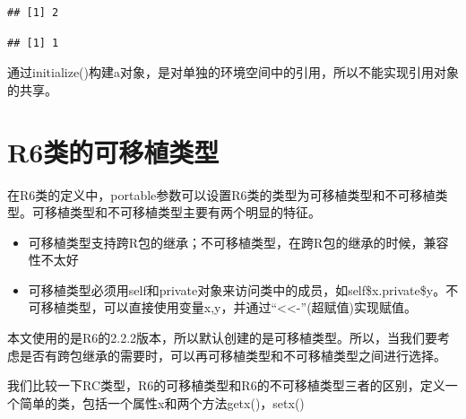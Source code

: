 \documentclass[]{book}
\newenvironment{Shaded}{\begin{snugshade}}{\end{snugshade}}
\newcommand{\KeywordTok}[1]{\textcolor[rgb]{0.13,0.29,0.53}{\textbf{#1}}}
\newcommand{\DataTypeTok}[1]{\textcolor[rgb]{0.13,0.29,0.53}{#1}}
\newcommand{\DecValTok}[1]{\textcolor[rgb]{0.00,0.00,0.81}{#1}}
\newcommand{\StringTok}[1]{\textcolor[rgb]{0.31,0.60,0.02}{#1}}
\newcommand{\CommentTok}[1]{\textcolor[rgb]{0.56,0.35,0.01}{\textit{#1}}}
\newcommand{\ControlFlowTok}[1]{\textcolor[rgb]{0.13,0.29,0.53}{\textbf{#1}}}
\newcommand{\OperatorTok}[1]{\textcolor[rgb]{0.81,0.36,0.00}{\textbf{#1}}}
\newcommand{\NormalTok}[1]{#1}
\begin{document}
\begin{verbatim}
## [1] 2
\end{verbatim}

\begin{Shaded}
\end{Shaded}

\begin{verbatim}
## [1] 1
\end{verbatim}

通过initialize()构建a对象，是对单独的环境空间中的引用，所以不能实现引用对象的共享。

\section{R6类的可移植类型}\label{r6}

在R6类的定义中，portable参数可以设置R6类的类型为可移植类型和不可移植类型。可移植类型和不可移植类型主要有两个明显的特征。

\begin{itemize}
\item
  可移植类型支持跨R包的继承；不可移植类型，在跨R包的继承的时候，兼容性不太好
\item
  可移植类型必须用self和private对象来访问类中的成员，如self\$x.private\$y。不可移植类型，可以直接使用变量x,y，并通过``\textless{}\textless{}-''(超赋值)实现赋值。
\end{itemize}

本文使用的是R6的2.2.2版本，所以默认创建的是可移植类型。所以，当我们要考虑是否有跨包继承的需要时，可以再可移植类型和不可移植类型之间进行选择。

我们比较一下RC类型，R6的可移植类型和R6的不可移植类型三者的区别，定义一个简单的类，包括一个属性x和两个方法getx()，setx()

\begin{Shaded}
\end{Shaded}
\end{document}

